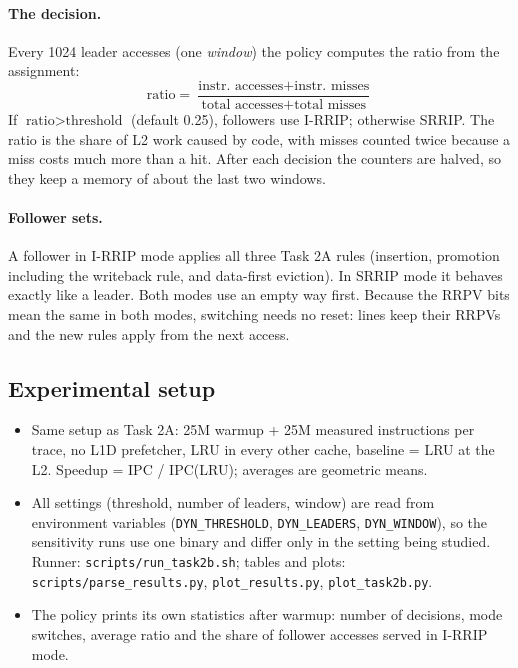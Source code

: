 \documentclass[11pt]{article}
\begin{document}
\paragraph{The decision.}
Every 1024 leader accesses (one \emph{window}) the policy computes the ratio
from the assignment:
\[
  \text{ratio} = \frac{\text{instr.\ accesses} + \text{instr.\ misses}}
                      {\text{total accesses} + \text{total misses}}
\]
If $\text{ratio} > \text{threshold}$ (default 0.25), followers use I-RRIP;
otherwise SRRIP. The ratio is the share of L2 work caused by code, with misses
counted twice because a miss costs much more than a hit. After each decision the
counters are halved, so they keep a memory of about the last two windows.

\paragraph{Follower sets.}
A follower in I-RRIP mode applies all three Task 2A rules (insertion,
promotion including the writeback rule, and data-first eviction). In SRRIP mode
it behaves exactly like a leader. Both modes use an empty way first. Because
the RRPV bits mean the same in both modes, switching needs no reset: lines keep
their RRPVs and the new rules apply from the next access.

\subsection{Experimental setup}
\begin{itemize}
  \item Same setup as Task 2A: 25M warmup + 25M measured instructions per
        trace, no L1D prefetcher, LRU in every other cache, baseline = LRU at
        the L2. Speedup = IPC / IPC(LRU); averages are geometric means.
  \item All settings (threshold, number of leaders, window) are read from
        environment variables (\texttt{DYN\_THRESHOLD}, \texttt{DYN\_LEADERS},
        \texttt{DYN\_WINDOW}), so the sensitivity runs use one binary and
        differ only in the setting being studied. Runner:
        \texttt{scripts/run\_task2b.sh}; tables and plots:
        \texttt{scripts/parse\_results.py}, \texttt{plot\_results.py},
        \texttt{plot\_task2b.py}.
  \item The policy prints its own statistics after warmup: number of decisions,
        mode switches, average ratio and the share of follower accesses served
        in I-RRIP mode.
\end{itemize}
\end{document}
